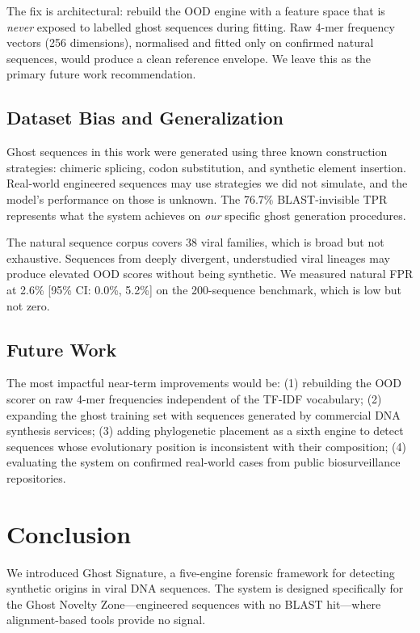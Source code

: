 \documentclass[conference]{IEEEtran}
\begin{document}
The fix is architectural: rebuild the OOD engine with a feature space that is \emph{never} exposed to labelled ghost sequences during fitting. Raw 4-mer frequency vectors (256 dimensions), normalised and fitted only on confirmed natural sequences, would produce a clean reference envelope. We leave this as the primary future work recommendation.

\subsection{Dataset Bias and Generalization}

Ghost sequences in this work were generated using three known construction strategies: chimeric splicing, codon substitution, and synthetic element insertion. Real-world engineered sequences may use strategies we did not simulate, and the model's performance on those is unknown. The 76.7\% BLAST-invisible TPR represents what the system achieves on \emph{our} specific ghost generation procedures.

The natural sequence corpus covers 38 viral families, which is broad but not exhaustive. Sequences from deeply divergent, understudied viral lineages may produce elevated OOD scores without being synthetic. We measured natural FPR at 2.6\% [95\% CI: 0.0\%, 5.2\%] on the 200-sequence benchmark, which is low but not zero.

\subsection{Future Work}

The most impactful near-term improvements would be: (1) rebuilding the OOD scorer on raw 4-mer frequencies independent of the TF-IDF vocabulary; (2) expanding the ghost training set with sequences generated by commercial DNA synthesis services; (3) adding phylogenetic placement as a sixth engine to detect sequences whose evolutionary position is inconsistent with their composition; (4) evaluating the system on confirmed real-world cases from public biosurveillance repositories.

\section{Conclusion}
\label{sec:conc}

We introduced Ghost Signature, a five-engine forensic framework for detecting synthetic origins in viral DNA sequences. The system is designed specifically for the Ghost Novelty Zone---engineered sequences with no BLAST hit---where alignment-based tools provide no signal.
\end{document}
